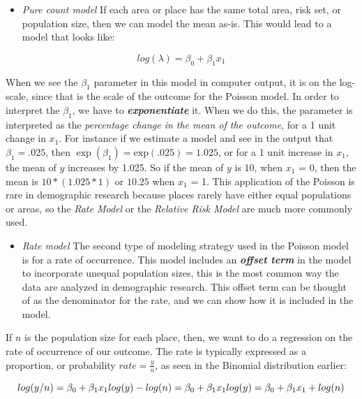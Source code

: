 \documentclass[
]{article}
\providecommand{\tightlist}{%
  \setlength{\itemsep}{0pt}\setlength{\parskip}{0pt}}
\begin{document}
\begin{itemize}
\tightlist
\item
  \emph{Pure count model} If each area or place has the same total area, risk set, or population size, then we can model the mean as-is. This would lead to a model that looks like:
\end{itemize}

\[log(\lambda)= \beta_0 + \beta_1 x_1\]

When we see the \(\beta_1\) parameter in this model in computer output, it is on the log-scale, since that is the scale of the outcome for the Poisson model. In order to interpret the \(\beta_1\), we have to \textbf{\emph{exponentiate}} it. When we do this, the parameter is interpreted as the \emph{percentage change in the mean of the outcome}, for a 1 unit change in \(x_1\). For instance if we estimate a model and see in the output that \(\beta_1 = \text{.025}\), then \(\exp(\beta_1) = \text{exp}(\text{.025}) = \text{1.025}\), or for a 1 unit increase in \(x_1\), the mean of \(y\) increases by 1.025. So if the mean of \(y\) is 10, when \(x_1\) = 0, then the mean is \(10*(1.025*1)\) or \(10.25\) when \(x_1\) = 1. This application of the Poisson is rare in demographic research because places rarely have either equal populations or areas, so the \emph{Rate Model} or the \emph{Relative Risk Model} are much more commonly used.

\begin{itemize}
\tightlist
\item
  \emph{Rate model} The second type of modeling strategy used in the Poisson model is for a rate of occurrence. This model includes an \textbf{\emph{offset term}} in the model to incorporate unequal population sizes, this is the most common way the data are analyzed in demographic research. This offset term can be thought of as the denominator for the rate, and we can show how it is included in the model.
\end{itemize}

If \(n\) is the population size for each place, then, we want to do a regression on the rate of occurrence of our outcome. The rate is typically expressed as a proportion, or probability \(rate = \frac{y}{n}\), as seen in the Binomial distribution earlier:

\[
log(y/n)= \beta_0 + \beta_1 x_1 \\
log(y) - log(n)= \beta_0 + \beta_1 x_1\\
log(y)= \beta_0 + \beta_1 x_1 + log(n)
\]
\end{document}
